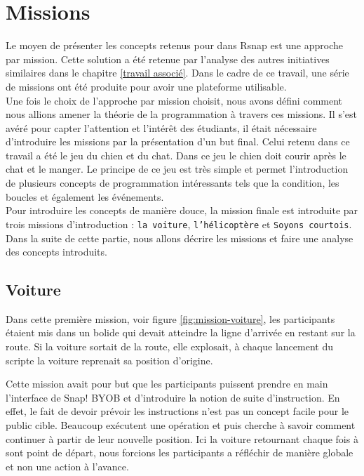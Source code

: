 ﻿\section{Missions}
\label{missions}
Le moyen de présenter les concepts retenus pour dans Rsnap est une approche par mission. Cette solution a été retenue par l'analyse des autres initiatives similaires dans le chapitre \ref{travail associé}. Dans le cadre de ce travail, une série de missions ont été produite pour avoir une plateforme utilisable.\\

Une fois le choix de l'approche par mission choisit, nous avons défini comment nous allions amener la théorie de la programmation à travers ces missions. Il s'est avéré pour capter l'attention et l'intérêt des étudiants, il était nécessaire d'introduire les missions par la présentation d'un but final. Celui retenu dans ce travail a été le jeu du chien et du chat. Dans ce jeu le chien doit courir après le chat et le manger. Le principe de ce jeu est très simple et permet l'introduction de plusieurs concepts de programmation intéressants tels que la condition, les boucles et également les événements.\\

Pour introduire les concepts de manière douce, la mission finale est introduite par trois missions d'introduction : \texttt{la voiture}, \texttt{l'hélicoptère} et \texttt{Soyons courtois}. Dans la suite de cette partie, nous allons décrire les missions et faire une analyse des concepts introduits.

\subsection{Voiture}
\label{mission-voiture}
Dans cette première mission, voir figure \ref{fig:mission-voiture}, les participants étaient mis dans un bolide qui devait atteindre la ligne d'arrivée en restant sur la route. Si la voiture sortait de la route, elle explosait, à chaque lancement du scripte la voiture reprenait sa position d'origine.

Cette mission avait pour but que les participants puissent prendre en main l'interface de Snap! BYOB et d'introduire la notion de suite d'instruction. En effet, le fait de devoir prévoir les instructions n'est pas un concept facile pour le public cible. Beaucoup exécutent une opération et puis cherche à savoir comment continuer à partir de leur nouvelle position. Ici la voiture retournant chaque fois à sont point de départ, nous forcions les participants a réfléchir de manière globale et non une action à l'avance.


